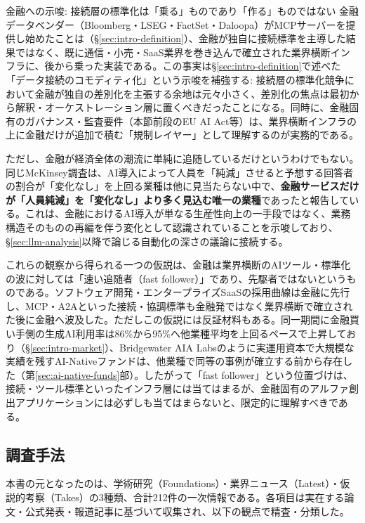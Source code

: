 \begin{insight}{金融への示唆: 接続層の標準化は「乗る」ものであり「作る」ものではない}
金融データベンダー（Bloomberg・LSEG・FactSet・Daloopa）がMCPサーバーを提供し始めたことは（\S\ref{sec:intro-definition}）、金融が独自に接続標準を主導した結果ではなく、既に通信・小売・SaaS業界を巻き込んで確立された業界横断インフラに、後から乗った実装である。この事実は\S\ref{sec:intro-definition}で述べた「データ接続のコモディティ化」という示唆を補強する: 接続層の標準化競争において金融が独自の差別化を主張する余地は元々小さく、差別化の焦点は最初から解釈・オーケストレーション層に置くべきだったことになる。同時に、金融固有のガバナンス・監査要件（本節前段のEU AI Act等）は、業界横断インフラの上に金融だけが追加で積む「規制レイヤー」として理解するのが実務的である。
\end{insight}

ただし、金融が経済全体の潮流に単純に追随しているだけというわけでもない。同じMcKinsey調査は、AI導入によって人員を「純減」させると予想する回答者の割合が「変化なし」を上回る業種は他に見当たらない中で、\textbf{金融サービスだけが「人員純減」を「変化なし」より多く見込む唯一の業種}であったと報告している\cite{x01mckinsey2025stateofai}。これは、金融におけるAI導入が単なる生産性向上の一手段ではなく、業務構造そのものの再編を伴う変化として認識されていることを示唆しており、\S\ref{sec:llm-analysis}以降で論じる自動化の深さの議論に接続する。

これらの観察から得られる一つの仮説は、金融は業界横断のAIツール・標準化の波に対しては「速い追随者（fast follower）」であり、先駆者ではないというものである。ソフトウェア開発・エンタープライズSaaSの採用曲線は金融に先行し、MCP・A2Aといった接続・協調標準も金融発ではなく業界横断で確立された後に金融へ波及した。ただしこの仮説には反証材料もある。同一期間に金融買い手側の生成AI利用率は86\%から95\%へ他業種平均を上回るペースで上昇しており（\S\ref{sec:intro-market}）、Bridgewater AIA Labsのように実運用資本で大規模な実績を残すAI-Nativeファンドは、他業種で同等の事例が確立する前から存在した（第\ref{sec:ai-native-funds}部）。したがって「fast follower」という位置づけは、接続・ツール標準といったインフラ層には当てはまるが、金融固有のアルファ創出アプリケーションには必ずしも当てはまらないと、限定的に理解すべきである。

\subsection{調査手法}

本書の元となったのは、学術研究（Foundations）・業界ニュース（Latest）・仮説的考察（Takes）の3種類、合計212件の一次情報である。各項目は実在する論文・公式発表・報道記事に基づいて収集され、以下の観点で精査・分類した。

